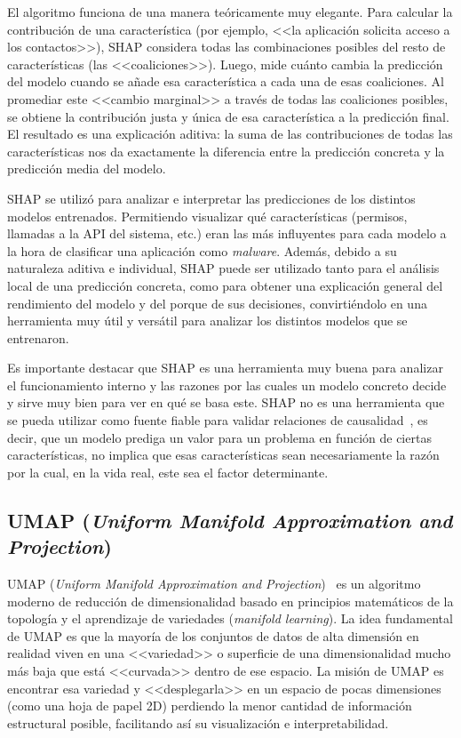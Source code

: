 El algoritmo funciona de una manera teóricamente muy elegante. Para calcular la contribución de una característica (por ejemplo, <<la aplicación solicita acceso a los contactos>>), SHAP considera todas las combinaciones posibles del resto de características (las <<coaliciones>>). Luego, mide cuánto cambia la predicción del modelo cuando se añade esa característica a cada una de esas coaliciones. Al promediar este <<cambio marginal>> a través de todas las coaliciones posibles, se obtiene la contribución justa y única de esa característica a la predicción final. El resultado es una explicación aditiva: la suma de las contribuciones de todas las características nos da exactamente la diferencia entre la predicción concreta y la predicción media del modelo.

SHAP se utilizó para analizar e interpretar las predicciones de los distintos modelos entrenados. Permitiendo visualizar qué características (permisos, llamadas a la API del sistema, etc.) eran las más influyentes para cada modelo a la hora de clasificar una aplicación como \textit{malware}. Además, debido a su naturaleza aditiva e individual, SHAP puede ser utilizado tanto para el análisis local de una predicción concreta, como para obtener una explicación general del rendimiento del modelo y del porque de sus decisiones, convirtiéndolo en una herramienta muy útil y versátil para analizar los distintos modelos que se entrenaron.

Es importante destacar que SHAP es una herramienta muy buena para analizar el funcionamiento interno y las razones por las cuales un modelo concreto decide y sirve muy bien para ver en qué se basa este. SHAP no es una herramienta que se pueda utilizar como fuente fiable para validar relaciones de causalidad~\cite{shapNotCausal}, es decir, que un modelo prediga un valor para un problema en función de ciertas características, no implica que esas características sean necesariamente la razón por la cual, en la vida real, este sea el factor determinante. 

\subsection{UMAP (\textit{Uniform Manifold Approximation and Projection})}

UMAP (\textit{Uniform Manifold Approximation and Projection})~\cite{mcinnes2018umap} es un algoritmo moderno de reducción de dimensionalidad basado en principios matemáticos de la topología y el aprendizaje de variedades (\textit{manifold learning}). La idea fundamental de UMAP es que la mayoría de los conjuntos de datos de alta dimensión en realidad viven en una <<variedad>> o superficie de una dimensionalidad mucho más baja que está <<curvada>> dentro de ese espacio. La misión de UMAP es encontrar esa variedad y <<desplegarla>> en un espacio de pocas dimensiones (como una hoja de papel 2D) perdiendo la menor cantidad de información estructural posible, facilitando así su visualización e interpretabilidad.

